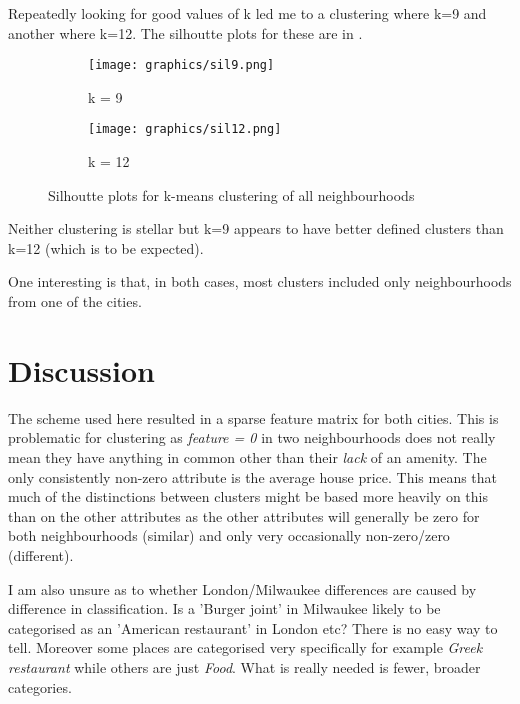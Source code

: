 \documentclass[a4paper,12pt,final,UKenglish]{article}
\begin{document}
            Repeatedly looking for good values of k led me to a clustering where k=9 and another where k=12.
            The silhoutte plots for these are in .
\begin{figure}
    \centering
    \begin{subfigure}[b]{0.4\textwidth}
        \texttt{[image: graphics/sil9.png]}
        \caption{k = 9}
    \end{subfigure}
    \qquad
    \begin{subfigure}[b]{0.4\textwidth}
        \texttt{[image: graphics/sil12.png]}
        \caption{k = 12}
    \end{subfigure}
    \caption{Silhoutte plots for k-means clustering of all neighbourhoods}
    \label{fig:sils9and12}
\end{figure}
            Neither clustering is stellar but k=9 appears to have better defined clusters than k=12 (which is to be expected).

            One interesting is that, in both cases, most clusters included only neighbourhoods from one of the cities.

    \section{Discussion}
            The scheme used here resulted in a sparse feature matrix for both cities.
            This is problematic for clustering as \textsl{feature = 0} in two neighbourhoods does not really mean they have anything in common other than their \emph{lack} of an amenity.
            The only consistently non-zero attribute is the average house price.
            This means that much of the distinctions between clusters might be based more heavily on this than on the other attributes as the other attributes will generally be zero for
            both neighbourhoods (similar) and only very occasionally non-zero/zero (different).

            I am also unsure as to whether London/Milwaukee differences are caused by difference in classification.
            Is a 'Burger joint' in Milwaukee likely to be categorised as an 'American restaurant' in London etc?
            There is no easy way to tell.
            Moreover some places are categorised very specifically for example \textit{Greek restaurant} while others are just \textit{Food}.
            What is really needed is fewer, broader categories.
            
\end{document}
